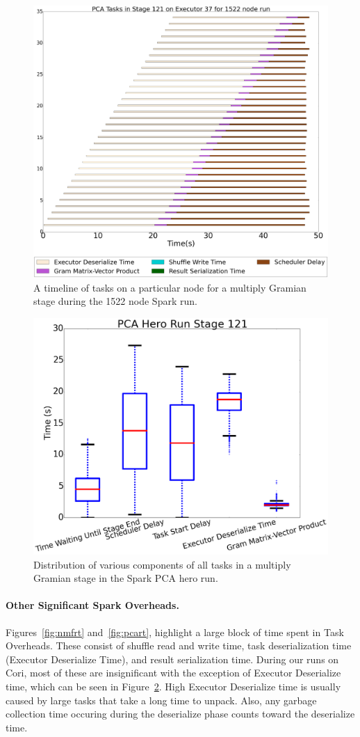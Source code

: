 \begin{figure}[tbhp]
\centering
\includegraphics[width=.6\textwidth]{fig/spark_pca_hero_timeline.png}
\caption{A timeline of tasks on a particular node for a multiply Gramian stage during the 1522 node Spark run. }
\label{fig:hero-timeline}
\end{figure}

\begin{figure}[tbhp]
\centering
\includegraphics[width=.6\textwidth]{fig/pca_box_and_whiskers.png}
\caption{Distribution of various components of all tasks in a multiply Gramian stage in the Spark PCA hero run. }
\label{fig:whisker}
\end{figure}
\paragraph{Other Significant Spark Overheads.}
Figures~\ref{fig:nmfrt} and~\ref{fig:pcart}, highlight a large block of time spent in Task Overheads. These consist of  shuffle read and write time, task deserialization time (Executor Deserialize Time), and result serialization time.  During our runs on Cori, most of these are insignificant with the exception of Executor Deserialize time, which can be seen in  Figure~\ref{fig:whisker}.  High Executor Deserialize time is usually caused by large tasks that take a long time to unpack. Also, any garbage collection time occuring during the deserialize phase counts toward the deserialize time.

